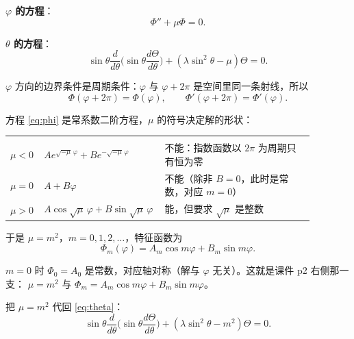 \textbf{$\varphi$ 的方程}：
\begin{equation}
\Phi''+\mu\Phi=0 .
\label{eq:phi}
\end{equation}

\textbf{$\theta$ 的方程}：
\begin{equation}
\sin\theta\frac{d}{d\theta}\Big(\sin\theta\frac{d\Theta}{d\theta}\Big)+(\lambda\sin^2\theta-\mu)\Theta=0 .
\label{eq:theta}
\end{equation}


$\varphi$ 方向的边界条件是周期条件：$\varphi$ 与 $\varphi+2\pi$ 是空间里同一条射线，所以
\[
\Phi(\varphi+2\pi)=\Phi(\varphi),\qquad \Phi'(\varphi+2\pi)=\Phi'(\varphi).
\]

方程 \eqref{eq:phi} 是常系数二阶方程，$\mu$ 的符号决定解的形状：

\begin{center}
\tabtop
\begin{tabular}{@{}L{0.10\linewidth}L{0.30\linewidth}L{0.48\linewidth}@{}}
\thead{$\mu$} &  &  \\
\tabmidrule
$\mu<0$ & $Ae^{\sqrt{-\mu}\,\varphi}+Be^{-\sqrt{-\mu}\,\varphi}$ & 不能：指数函数以 $2\pi$ 为周期只有恒为零 \\
$\mu=0$ & $A+B\varphi$ & 不能（除非 $B=0$，此时是常数，对应 $m=0$） \\
$\mu>0$ & $A\cos\sqrt{\mu}\,\varphi+B\sin\sqrt{\mu}\,\varphi$ & 能，但要求 $\sqrt{\mu}$ 是整数 \\
\end{tabular}
\tabbot
\end{center}

于是 $\mu=m^2$，$m=0,1,2,\dots$，特征函数为
\begin{equation}
\Phi_m(\varphi)=A_m\cos m\varphi+B_m\sin m\varphi .
\label{eq:phim}
\end{equation}

$m=0$ 时 $\Phi_0=A_0$ 是常数，对应轴对称（解与 $\varphi$ 无关）。这就是课件 p2 右侧那一支：
$\mu=m^2$ 与 $\Phi_m=A_m\cos m\varphi+B_m\sin m\varphi$。


把 $\mu=m^2$ 代回 \eqref{eq:theta}：
\begin{equation}
\sin\theta\frac{d}{d\theta}\Big(\sin\theta\frac{d\Theta}{d\theta}\Big)+(\lambda\sin^2\theta-m^2)\Theta=0 .
\label{eq:theta2}
\end{equation}

